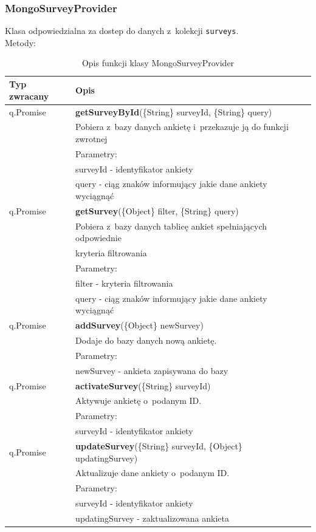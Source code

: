 \documentclass[12pt,a4paper,notitlepage]{article}
\begin{document}
\subsubsection{MongoSurveyProvider}
Klasa odpowiedzialna za dostep do danych z~kolekcji \texttt{surveys}. \\
Metody:
\begin{center}
\begin{table}[H]
\caption{Opis funkcji klasy MongoSurveyProvider}
  \begin{tabular}{| l| l|}%
    \hline
    Typ zwracany & Opis \\ \hline \hline
  	q.Promise	&	\textbf{getSurveyById}(\{String\} surveyId, \{String\} query) \\
 &  Pobiera z~bazy danych ankietę i~przekazuje ją do funkcji zwrotnej \\ 
 & Parametry: \\
 & surveyId - identyfikator ankiety \\ 
 & query - ciąg znaków informujący jakie dane ankiety wyciągnąć \\ \hline

q.Promise	&	\textbf{getSurvey}(\{Object\} filter, \{String\} query) \\
 &  Pobiera z~bazy danych tablicę ankiet spełniających odpowiednie  \\ & kryteria filtrowania \\ 
 & Parametry: \\
 & filter - kryteria filtrowania \\ 
 & query - ciąg znaków informujący jakie dane ankiety wyciągnąć \\ \hline
   
q.Promise	&	\textbf{addSurvey}(\{Object\} newSurvey) \\
 &  Dodaje do bazy danych nową ankietę.\\ 
 & Parametry: \\
 & newSurvey - ankieta zapisywana do bazy \\ 
 \hline

q.Promise	&	\textbf{activateSurvey}(\{String\} surveyId) \\
 &  Aktywuje ankietę o~podanym ID.\\ 
 & Parametry: \\
 & surveyId - identyfikator ankiety \\ 
 \hline
   
q.Promise	&	\textbf{updateSurvey}(\{String\} surveyId, \{Object\} updatingSurvey) \\
 &  Aktualizuje dane ankiety o~podanym ID. \\ 
 & Parametry: \\
 & surveyId - identyfikator ankiety \\ 
 & updatingSurvey - zaktualizowana ankieta \\ \hline


\end{tabular}
\end{table}
\end{center}
\end{document}
